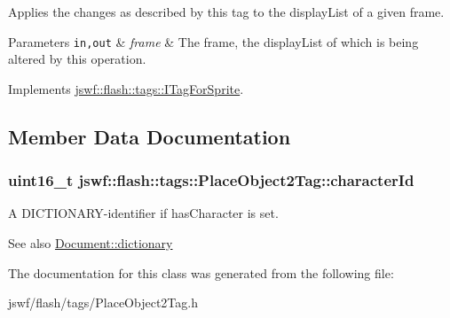 Applies the changes as described by this tag to the display\+List of a given frame. 


\begin{DoxyParams}[1]{Parameters}
\mbox{\tt in,out}  & {\em frame} & The frame, the display\+List of which is being altered by this operation. \\
\hline
\end{DoxyParams}


Implements \hyperlink{classjswf_1_1flash_1_1tags_1_1_i_tag_for_sprite}{jswf\+::flash\+::tags\+::\+I\+Tag\+For\+Sprite}.



\subsection{Member Data Documentation}
\hypertarget{classjswf_1_1flash_1_1tags_1_1_place_object2_tag_a01ac82d73c8ceb98c08b5c6ab46cf6d7}{
\subsubsection[{character\+Id}]{\setlength{\rightskip}{0pt plus 5cm}uint16\+\_\+t jswf\+::flash\+::tags\+::\+Place\+Object2\+Tag\+::character\+Id}}\label{classjswf_1_1flash_1_1tags_1_1_place_object2_tag_a01ac82d73c8ceb98c08b5c6ab46cf6d7}


A {\ttfamily D\+I\+C\+T\+I\+O\+N\+A\+R\+Y}-\/identifier if has\+Character is set. 

\begin{DoxySeeAlso}{See also}
\hyperlink{classjswf_1_1flash_1_1_document_aca1e9bbd368ff49f61d59a4fed7754a9}{Document\+::dictionary} 
\end{DoxySeeAlso}


The documentation for this class was generated from the following file\+:\begin{DoxyCompactItemize}
\item 
jswf/flash/tags/Place\+Object2\+Tag.\+h\end{DoxyCompactItemize}
